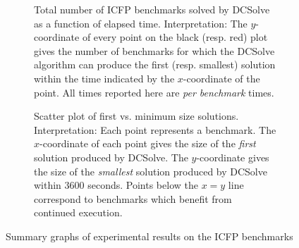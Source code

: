 \documentclass{llncs}
\newcommand{\dcsolve}{{\sffamily\fontsize{8.5}{10}\selectfont
    DCSolve}\xspace}
\begin{document}
\begin{figure}[!t]
\centering
\begin{subfigure}{0.45\textwidth}
  \caption{Total number of ICFP benchmarks solved by \dcsolve as a
    function of elapsed
    time. Interpretation: The $y$-coordinate of every point on the
    black (resp. red) plot gives the number of benchmarks for which
    the \dcsolve algorithm can produce the first (resp. smallest)
    solution within the time indicated by the $x$-coordinate of the
    point. All times reported here are \emph{per benchmark} times.}
  \label{subfigure:solved_vs_time}
\end{subfigure}
\quad
\begin{subfigure}{0.45\textwidth}
  \caption{Scatter plot of first vs. minimum size
    solutions. Interpretation: Each point represents a benchmark. The
    $x$-coordinate of each point gives the size of the \emph{first}
    solution produced by \dcsolve. The $y$-coordinate gives the size
    of the \emph{smallest} solution produced by \dcsolve within 3600
    seconds. Points below the $x = y$ line correspond to benchmarks
    which benefit from continued execution.}
  \label{subfigure:first_vs_best}
\end{subfigure}
\caption{Summary graphs of experimental results on the ICFP benchmarks}
\end{figure}
\end{document}

